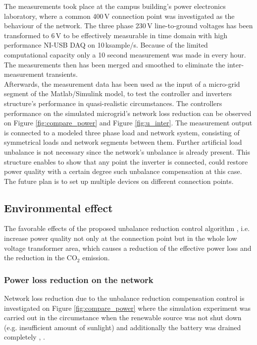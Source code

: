             The measurements took place at the campus building's power electronics laboratory, where a common 400\,V connection point was investigated as the behaviour of the network. The three phase 230\,V line-to-ground voltages has been transformed to 6\,V to be effectively measurable in time domain with high performance NI-USB DAQ on 10\,ksample/s. Because of the limited computational capacity only a 10 second measurement was made in every hour.  The measurements then has been merged and smoothed to eliminate the inter-measurement transients.\\
            Afterwards, the measurement data has been used as the input of a micro-grid segment of the Matlab/Simulink model, to test the controller and inverters structure's performance in quasi-realistic circumstances. The controllers performance on the simulated microgrid's network loss reduction can be observed on Figure \ref{fig:compare_power} and Figure \ref{fig:u_inter}. The measurement output is connected to a modeled three phase load and network system, consisting of symmetrical loads and network segments between them. Further artificial load unbalance is not necessary since the network's unbalance is already present. This structure enables to show that any point the inverter is connected, could restore power quality with a certain degree such unbalance compensation at this case. The future plan is to set up multiple devices on different connection points.

    \subsection{Environmental effect}\label{VUB:sec:Environment}

    The favorable effects of the proposed unbalance reduction control algorithm , i.e. increase power quality not only at the connection point but in the whole low voltage transformer area, which causes a reduction of the effective power loss and the reduction in the CO${}_2$ emission.

        \subsubsection{Power loss reduction on the network}\label{VUB:sec:Powerloss}

             Network loss reduction due to the unbalance reduction compensation control is investigated on Figure \ref{fig:compare_power} where the simulation experiment was carried out in the circumstance when the renewable source was not shut down (e.g. insufficient amount of sunlight) and additionally the battery was drained completely  \cite{Neukirchner2015}, \cite{neukirchner2015examination}.

